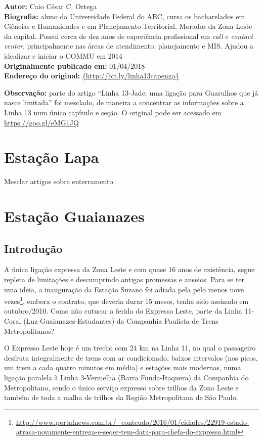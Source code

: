 \documentclass[11pt,fleqn]{book} %
\newcommand{\infocaio}[2]{\textbf{Autor:} Caio C\'{e}sar C. Ortega \\ \textbf{Biografia:} aluno da Universidade Federal do ABC, cursa os bacharelados em Ci\^{e}ncias e Humanidades e em Planejamento Territorial. Morador da Zona Leste da capital. Possui cerca de dez anos de experi\^{e}ncia profissional em \textit{call} e \textit{contact center}, principalmente nas \'{a}reas de atendimento, planejamento e MIS. Ajudou a idealizar e iniciar o COMMU em 2014 \\ \textbf{Originalmente publicado em:} {#1} \\ \textbf{Endere\c{c}o do original:} \url{{#2}}}
\begin{document}
\begin{info}
	\infocaio{01/04/2018}{http://bit.ly/linha13capenga}
\end{info}

\begin{obs}
	\textbf{Observação:} parte do artigo ``Linha 13-Jade: uma ligação para Guarulhos que já nasce limitada'' foi mesclado, de maneira a concentrar as informações sobre a Linha 13 num único capítulo e seção. O original pode ser acessado em \url{https://goo.gl/eMG1JQ}
\end{obs}

\section{Estação Lapa}

Mesclar artigos sobre enterramento.

\section{Estação Guaianazes}

\subsection{Introdução}

A única ligação expressa da Zona Leste e com quase 16 anos de existência, segue repleta de limitações e descumprindo antigas promessas e anseios. Para se ter uma ideia, a inauguração da Estação Suzano foi adiada pela pelo menos nove vezes\footnote{\url{http://www.portalnews.com.br/_conteudo/2016/01/cidades/22919-estado-atrasa-novamente-entrega-e-seqer-tem-data-para-chefa-do-expresso.html}}, embora o contrato, que deveria durar 15 meses, tenha sido assinado em outubro/2010. Como não cutucar a ferida do Expresso Leste, parte da Linha 11-Coral (Luz-Guaianazes-Estudantes) da Companhia Paulista de Trens Metropolitanos?

O Expresso Leste hoje é um trecho com 24 km na Linha 11, no qual o passageiro desfruta integralmente de trens com ar condicionado, baixos intervalos (nos picos, um trem a cada quatro minutos em média) e estações mais modernas, numa ligação paralela à Linha 3-Vermelha (Barra Funda-Itaquera) da Companhia do Metropolitano, sendo o único serviço expresso sobre trilhos da Zona Leste e também de toda a malha de trilhos da Região Metropolitana de São Paulo.

\end{document}
